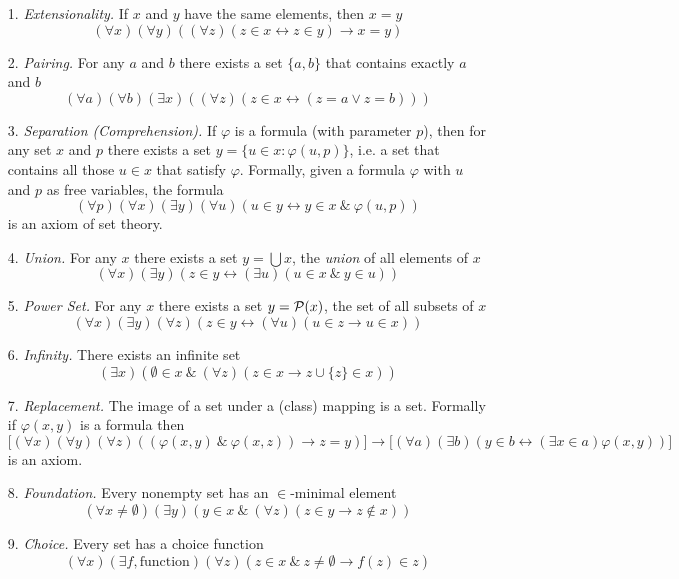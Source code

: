 \begin{itemize}
\item[1.]\emph{Extensionality.} If $x$ and $y$ have the same elements, then
$x=y$ $$(\forall x)(\forall y)((\forall z)(z\in x\leftrightarrow z\in y)\rightarrow x=y)$$
\item[2.]\emph{Pairing.} For any $a$ and $b$ there exists a set $\{a, b\}$ that
contains exactly $a$ and $b$
$$(\forall a)(\forall b)(\exists x)((\forall z)(z\in x\leftrightarrow (z=a\vee z=b)))$$
\item[3.]\emph{Separation (Comprehension).} If $\varphi$ is a formula (with parameter $p$),
then for any set $x$ and $p$ there exists a set $y = \{u \in x : \varphi(u, p)\}$,
i.e. a set that contains all those $u \in x$ that satisfy $\varphi$. Formally, given a formula $\varphi$ with $u$ and $p$ as  free
variables, the formula
$$(\forall p)(\forall x)(\exists y)(\forall u)(u\in y\leftrightarrow y\in x\ \&\ \varphi(u,p))$$
is an axiom of set theory.
\item[4.]\emph{Union.} For any $x$ there exists a set $y =\bigcup x$, the \emph{union}
of all elements of $x$
$$(\forall x)(\exists y)(z\in y\leftrightarrow (\exists u)(u\in x\ \&\ y\in u))$$
\item[5.]\emph{Power Set.} For any $x$ there exists a set $y = {{\mathcal P}} (x)$, the
set of all subsets of $x$
$$(\forall x)(\exists y)(\forall z)(z\in y\leftrightarrow (\forall u)(u\in z\rightarrow u\in x))$$
\item[6.]\emph{Infinity.} There exists an infinite set
$$(\exists x)(\emptyset\in x\ \&\ (\forall z)(z\in x\rightarrow z\cup\{z\} \in x))$$
\item[7.]\emph{Replacement.} The image of a set under a (class) mapping is a set. Formally if $\varphi(x,y)$ is a formula then
$$\big[(\forall x)(\forall y)(\forall z)((\varphi(x,y)\ \&\ \varphi(x,z)) \rightarrow z=y)\big]\rightarrow
\big[(\forall a)(\exists b)(y\in b\leftrightarrow (\exists x\in a)\varphi(x,y))\big]$$
 is an axiom.
\item[8.]\emph{Foundation.} Every nonempty set has an $\in$-minimal element
$$(\forall x\neq\emptyset)(\exists y)(y\in x\ \&\ (\forall z)(z\in y\rightarrow z\not\in x))$$
\item[9.]\emph{Choice.} Every set has a choice function
$$(\forall x)(\exists f, \mbox{function})(\forall z)(z\in x\ \&\ z\neq\emptyset\rightarrow f(z)\in z)$$
\end{itemize}

